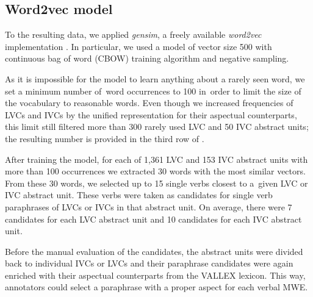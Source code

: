\documentclass[output=paper,modfonts,nonflat]{langsci/langscibook}
\begin{document}
\subsection{Word2vec model}
\label{sec:word2vec}
To the resulting data, we applied \emph{gensim}, a freely available 
\emph{word2vec} implementation \citep{rehurek_lrec}. In particular, we 
used a model of vector size 500 with continuous bag of word (CBOW) training 
algorithm and negative sampling. 

As it is impossible for the model to learn anything about a rarely seen word, we set a minimum number of~word occurrences to 100 in~order to limit the size 
of the vocabulary to reasonable words. Even though we increased frequencies 
of LVCs and IVCs by the unified representation for their aspectual counterparts, 
this limit still filtered more than 300 rarely used LVC and 50 IVC abstract units; 
the resulting number is provided in the third row of .

After training the model, for each of 1,361 LVC and 153 IVC abstract units with 
more than 100 occurrences we extracted 30 words with the most similar vectors. 
From these 30 words, we selected up to 15 single verbs closest to a~given 
LVC or IVC abstract unit. These verbs were taken as candidates for single verb 
paraphrases of LVCs or IVCs in that abstract unit. On average, there were 7 
candidates for each LVC abstract unit and 10 candidates for each IVC abstract 
unit.

Before the manual evaluation of the candidates, the abstract units were divided 
back to individual IVCs or LVCs and their paraphrase candidates were again 
enriched with their aspectual counterparts from the VALLEX lexicon. This way, annotators 
could select a paraphrase with a proper aspect for each verbal MWE.

%
\end{document}
